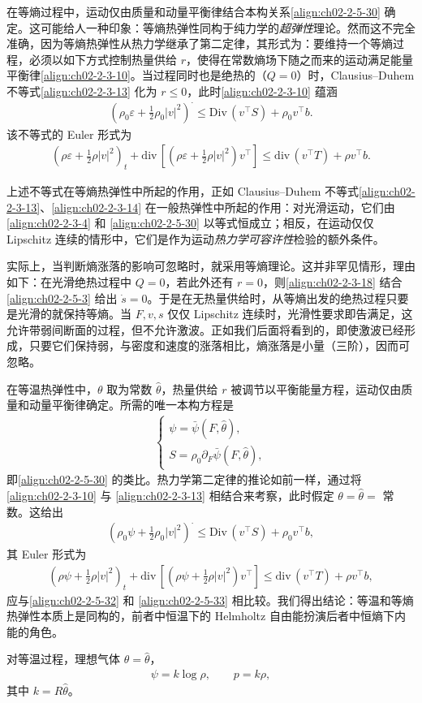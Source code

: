 \documentclass[../../main.tex]{subfiles}
\begin{document}
在等熵过程中，运动仅由质量和动量平衡律结合本构关系\eqref{align:ch02-2-5-30} 确定。这可能给人一种印象：等熵热弹性同构于纯力学的\emph{超弹性}理论。然而这不完全准确，因为等熵热弹性从热力学继承了第二定律，其形式为：要维持一个等熵过程，必须以如下方式控制热量供给 $r$，使得在常数熵场下随之而来的运动满足能量平衡律\eqref{align:ch02-2-3-10}。当过程同时也是绝热的（$Q=0$）时，Clausius--Duhem 不等式\eqref{align:ch02-2-3-13} 化为 $r\leqslant 0$，此时\eqref{align:ch02-2-3-10} 蕴涵
\begin{align}
(\rho_{0}\varepsilon+\tfrac{1}{2}\rho_{0}|v|^{2})^{\cdot}\leqslant\mathrm{Div}\,(v^{\top}S)+\rho_{0}v^{\top}b.
\label{align:ch02-2-5-32}
\end{align}
该不等式的 Euler 形式为
\begin{align}
(\rho\varepsilon+\tfrac{1}{2}\rho|v|^{2})_{t}+\mathrm{div}\,[(\rho\varepsilon+\tfrac{1}{2}\rho|v|^{2})v^{\top}]\leqslant\mathrm{div}\,(v^{\top}T)+\rho v^{\top}b.
\label{align:ch02-2-5-33}
\end{align}

上述不等式在等熵热弹性中所起的作用，正如 Clausius--Duhem 不等式\eqref{align:ch02-2-3-13}、\eqref{align:ch02-2-3-14} 在一般热弹性中所起的作用：对光滑运动，它们由\eqref{align:ch02-2-3-4} 和 \eqref{align:ch02-2-5-30} 以等式恒成立；相反，在运动仅仅 Lipschitz 连续的情形中，它们是作为运动\emph{热力学可容许性}检验的额外条件。

实际上，当判断熵涨落的影响可忽略时，就采用等熵理论。这并非罕见情形，理由如下：在光滑绝热过程中 $Q=0$，若此外还有 $r=0$，则\eqref{align:ch02-2-3-18} 结合\eqref{align:ch02-2-5-3} 给出 $\dot{s}=0$。于是在无热量供给时，从等熵出发的绝热过程只要是光滑的就保持等熵。当 $F,v,s$ 仅仅 Lipschitz 连续时，光滑性要求即告满足，这允许带弱间断面的过程，但不允许激波。正如我们后面将看到的，即使激波已经形成，只要它们保持弱，与密度和速度的涨落相比，熵涨落是小量（三阶），因而可忽略。

在等温热弹性中，$\theta$ 取为常数 $\hat{\theta}$，热量供给 $r$ 被调节以平衡能量方程，运动仅由质量和动量平衡律确定。所需的唯一本构方程是
\begin{align}
\begin{cases}
\psi=\bar{\psi}(F,\hat{\theta}),\\
S=\rho_{0}\partial_{F}\bar{\psi}(F,\hat{\theta}),
\end{cases}
\label{align:ch02-2-5-34}
\end{align}
即\eqref{align:ch02-2-5-30} 的类比。热力学第二定律的推论如前一样，通过将\eqref{align:ch02-2-3-10} 与 \eqref{align:ch02-2-3-13} 相结合来考察，此时假定 $\theta=\hat{\theta}=$ 常数。这给出
\begin{align}
(\rho_{0}\psi+\tfrac{1}{2}\rho_{0}|v|^{2})^{\cdot}\leqslant\mathrm{Div}\,(v^{\top}S)+\rho_{0}v^{\top}b,
\label{align:ch02-2-5-35}
\end{align}
其 Euler 形式为
\begin{align}
(\rho\psi+\tfrac{1}{2}\rho|v|^{2})_{t}+\mathrm{div}\,[(\rho\psi+\tfrac{1}{2}\rho|v|^{2})v^{\top}]\leqslant\mathrm{div}\,(v^{\top}T)+\rho v^{\top}b,
\label{align:ch02-2-5-36}
\end{align}
应与\eqref{align:ch02-2-5-32} 和 \eqref{align:ch02-2-5-33} 相比较。我们得出结论：等温和等熵热弹性本质上是同构的，前者中恒温下的 Helmholtz 自由能扮演后者中恒熵下内能的角色。

对等温过程，理想气体 $\theta=\hat{\theta}$，
\begin{align}
\psi=k\log\rho,\qquad p=k\rho,
\label{align:ch02-2-5-37}
\end{align}
其中 $k=R\hat{\theta}$。
\end{document}
